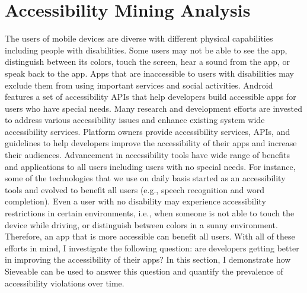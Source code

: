 \section{Accessibility Mining Analysis}
The users of mobile devices are diverse with different physical capabilities including people with disabilities.
Some users may not be able to see the app, distinguish between its colors, touch the screen, hear a sound from the app, or speak back to the app.
Apps that are inaccessible to users with disabilities may exclude them from using important services and social activities.
Android features a set of accessibility APIs that help developers build accessible apps for users who have special needs.
Many research and development efforts are invested to address various accessibility issues and enhance existing system wide accessibility services.
Platform owners provide accessibility services, APIs, and guidelines to help developers improve the accessibility of their apps and increase their audiences.
Advancement in accessibility tools have wide range of benefits and applications to all users including users with no special needs.
For instance, some of the technologies that we use on daily basis started as an accessibility tools and evolved to benefit all users (e.g., speech recognition and word completion).
Even a user with no disability may experience accessibility restrictions in certain environments, i.e., when someone is not able to touch the device while driving, or distinguish between colors in a sunny environment.
Therefore, an app that is more accessible can benefit all users.
With all of these efforts in mind, I investigate the following question: are developers getting better in improving the accessibility of their apps?
In this section, I demonstrate how Sieveable can be used to answer this question and quantify the prevalence of accessibility violations over time.

